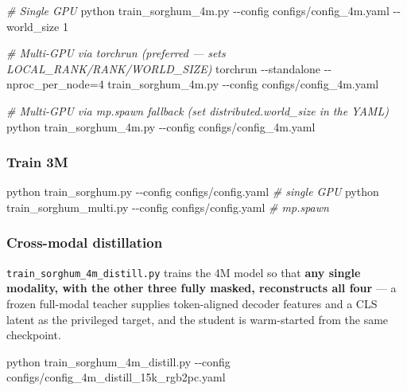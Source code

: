 \documentclass[
  10pt,
]{article}
\newenvironment{Shaded}{}{}
\newcommand{\AttributeTok}[1]{\textcolor[rgb]{0.49,0.56,0.16}{#1}}
\newcommand{\CommentTok}[1]{\textcolor[rgb]{0.38,0.63,0.69}{\textit{#1}}}
\newcommand{\ExtensionTok}[1]{#1}
\newcommand{\NormalTok}[1]{#1}
\newcommand{\OperatorTok}[1]{\textcolor[rgb]{0.40,0.40,0.40}{#1}}
\begin{document}
\begin{Shaded}
\begin{Highlighting}[]
\CommentTok{\# Single GPU}
\ExtensionTok{python}\NormalTok{ train\_sorghum\_4m.py }\AttributeTok{{-}{-}config}\NormalTok{ configs/config\_4m.yaml }\AttributeTok{{-}{-}world\_size}\NormalTok{ 1}

\CommentTok{\# Multi{-}GPU via torchrun (preferred — sets LOCAL\_RANK/RANK/WORLD\_SIZE)}
\ExtensionTok{torchrun} \AttributeTok{{-}{-}standalone} \AttributeTok{{-}{-}nproc\_per\_node}\OperatorTok{=}\NormalTok{4 train\_sorghum\_4m.py }\AttributeTok{{-}{-}config}\NormalTok{ configs/config\_4m.yaml}

\CommentTok{\# Multi{-}GPU via mp.spawn fallback (set distributed.world\_size in the YAML)}
\ExtensionTok{python}\NormalTok{ train\_sorghum\_4m.py }\AttributeTok{{-}{-}config}\NormalTok{ configs/config\_4m.yaml}
\end{Highlighting}
\end{Shaded}

\subsubsection{Train 3M}\label{train-3m}

\begin{Shaded}
\begin{Highlighting}[]
\ExtensionTok{python}\NormalTok{ train\_sorghum.py }\AttributeTok{{-}{-}config}\NormalTok{ configs/config.yaml                  }\CommentTok{\# single GPU}
\ExtensionTok{python}\NormalTok{ train\_sorghum\_multi.py }\AttributeTok{{-}{-}config}\NormalTok{ configs/config.yaml            }\CommentTok{\# mp.spawn}
\end{Highlighting}
\end{Shaded}

\subsubsection{Cross-modal distillation}\label{cross-modal-distillation}

\texttt{train\_sorghum\_4m\_distill.py} trains the 4M model so that
\textbf{any single modality, with the other three fully masked,
reconstructs all four} --- a frozen full-modal teacher supplies
token-aligned decoder features and a CLS latent as the privileged
target, and the student is warm-started from the same checkpoint.

\begin{Shaded}
\begin{Highlighting}[]
\ExtensionTok{python}\NormalTok{ train\_sorghum\_4m\_distill.py }\AttributeTok{{-}{-}config}\NormalTok{ configs/config\_4m\_distill\_15k\_rgb2pc.yaml}
\end{Highlighting}
\end{Shaded}
\end{document}
